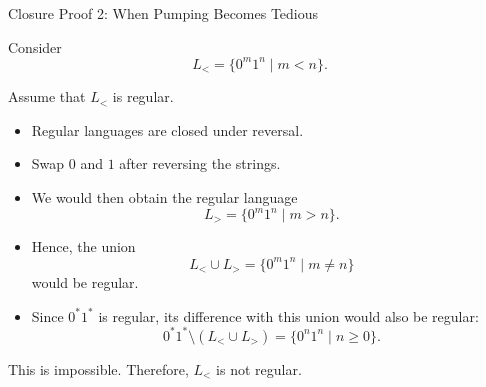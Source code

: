 \documentclass[10pt,aspectratio=169]{beamer}
\begin{document}
\begin{frame}{Closure Proof 2: When Pumping Becomes Tedious}

\small
Consider
\[
L_{<}
=
\{0^m1^n\mid m<n\}.
\]

Assume that $L_{<}$ is regular.

\vspace{0.4em}
\begin{itemize}
    \item Regular languages are closed under reversal.
    \item Swap $0$ and $1$ after reversing the strings.
    \item We would then obtain the regular language
    \[
    L_{>}
    =
    \{0^m1^n\mid m>n\}.
    \]
    \item Hence, the union
    \[
    L_{<}\cup L_{>}
    =
    \{0^m1^n\mid m\neq n\}
    \]
    would be regular.
    \item Since $0^*1^*$ is regular, its difference with this union
    would also be regular:
    \[
    0^*1^*\setminus(L_{<}\cup L_{>})
    =
    \{0^n1^n\mid n\geq 0\}.
    \]
\end{itemize}

This is impossible. Therefore, $L_{<}$ is not regular.

\end{frame}
\end{document}
